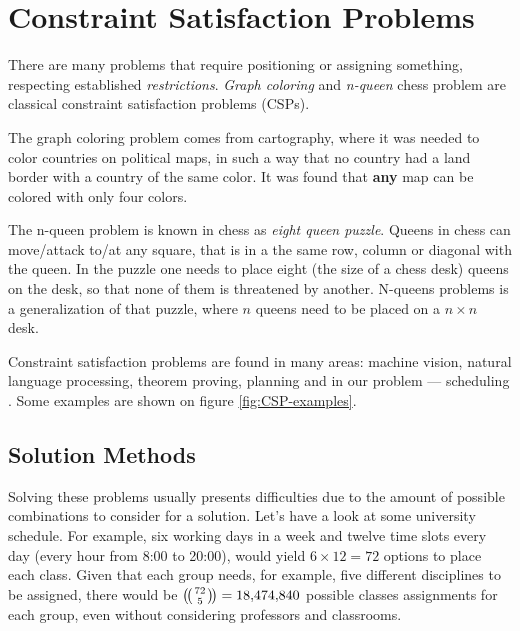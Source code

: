 \documentclass[header]{subfiles}
\begin{document}
\chapter{Constraint Satisfaction Problems}
\label{chapter:csp}

There are many problems that require positioning or assigning something,
respecting established \emph{restrictions}. \emph{Graph coloring} and
\emph{n-queen} chess problem are classical constraint satisfaction problems (CSPs).


The graph coloring problem comes from cartography, where it was needed to color
countries on political maps, in such a way that no country had a land border with
a country of the same color. It was found that \textbf{any} map can be colored
with only four colors.

The n-queen problem is known in chess as \emph{eight queen puzzle}.
Queens in chess can move/attack to/at any square,
that is in a the same row, column or diagonal with the queen.
In the puzzle one needs to place eight (the size of a chess desk)
queens on the desk, so that none of them is threatened by another.
N-queens problems is a generalization of that puzzle, where $n$ queens need
to be placed on a $n \times n$ desk.

Constraint satisfaction problems are found in many areas:
machine vision, natural language processing, theorem proving,
planning and in our problem --- scheduling \cite{MAS}.
Some examples are shown on figure \ref{fig:CSP-examples}.



\section{Solution Methods}
\label{sec:CSP-solution-methods}
  Solving these problems usually presents difficulties due to the amount of
possible combinations to consider for a solution. Let's have a look at
some university schedule.
  For example, six working days in a week and twelve time slots every day
(every hour from 8:00 to 20:00), would yield $6 \times 12 = 72$ options
to place each class.
  Given that each group needs, for example, five different disciplines to be assigned,
there would be $\multibinom{72}{5} = \num[group-separator={,}]{18474840}$
possible classes assignments for each group,
even without considering professors and classrooms.
\end{document}
